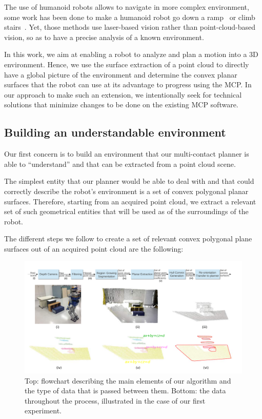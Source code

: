 The use of humanoid robots allows to navigate in more complex environment, some work has been done to make a humanoid robot go down a ramp~\cite{lutz:iros:2012} or climb stairs~\cite{osswald:iros:2012}.
Yet, those methods use laser-based vision rather than point-cloud-based vision, so as to have a precise analysis of a known environment.

In this work, we aim at enabling a robot to analyze and plan a motion into a 3D environment.
Hence, we use the surface extraction of a point cloud to directly have a global picture of the environment and determine the convex planar surfaces that the robot can use at its advantage to progress using the MCP.\@
In our approach to make such an extension, we intentionally seek for technical solutions that minimize changes to be done on the existing MCP software.

\subsection{Building an understandable environment}
\label{sub:building_an_understandable_environment}

Our first concern is to build an environment that our multi-contact planner is able to ``understand'' and that can be extracted from a point cloud scene.

The simplest entity that our planner would be able to deal with and that could correctly describe the robot's environment is a set of convex polygonal planar surfaces.
Therefore, starting from an acquired point cloud, we extract a relevant set of such geometrical entities that will be used as of the surroundings of the robot.

The different steps we follow to create a set of relevant convex polygonal plane surfaces out of an acquired point cloud are the following:

\begin{figure}
\centering
  \includegraphics[width=\linewidth]{complete_pipeline.pdf}
  \caption{Top: flowchart describing the main elements of our algorithm and the type of data that is passed between them. Bottom: the data throughout the process, illustrated in the case of our first experiment.}
\label{fig:full_pipeline}
\end{figure}

